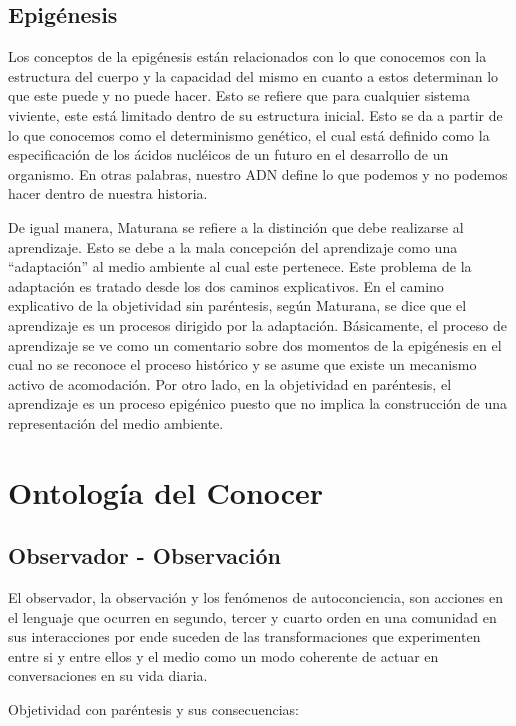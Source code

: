 \documentclass[10pt]{article}
\begin{document}
        \subsection{Epigénesis}

        Los conceptos de la epigénesis están relacionados con lo que conocemos con la estructura del cuerpo y la capacidad del mismo en cuanto a estos determinan lo que este puede y no puede hacer.  Esto se refiere que para cualquier sistema viviente, este está limitado dentro de su estructura inicial. Esto se da a partir de lo que conocemos como el determinismo genético, el cual está definido como la especificación de los ácidos nucléicos de un futuro en el desarrollo de un organismo. En otras palabras, nuestro ADN define lo que podemos y no podemos hacer dentro de nuestra historia.

        De igual manera, Maturana se refiere a la distinción que debe realizarse al aprendizaje. Esto se debe a la mala concepción del aprendizaje como una ``adaptación'' al medio ambiente al cual este pertenece. Este problema de la adaptación es tratado desde los dos caminos explicativos. En el camino explicativo de la objetividad sin paréntesis, según Maturana, se dice que el aprendizaje es un procesos dirigido por la adaptación. Básicamente, el proceso de aprendizaje se ve como un comentario sobre dos momentos de la epigénesis en el cual no se reconoce el proceso histórico y se asume que existe un mecanismo activo de acomodación. Por otro lado, en la objetividad en paréntesis, el aprendizaje es un proceso epigénico puesto que no implica la construcción de una representación del medio ambiente.

    \section{Ontología del Conocer}

        \subsection{Observador - Observación}

        El observador, la observación y los fenómenos de autoconciencia, son acciones en el lenguaje que ocurren en segundo, tercer y cuarto orden en una comunidad en sus interacciones por ende suceden de las transformaciones que experimenten entre si y entre ellos y el medio como un modo coherente de actuar en conversaciones en su vida diaria.

        Objetividad con paréntesis y sus consecuencias:
\end{document}
